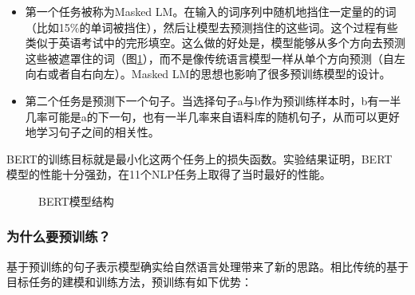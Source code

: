 \begin{itemize}
\vspace{0.5em}
\item 第一个任务被称为Masked LM。在输入的词序列中随机地挡住一定量的的词（比如15\%的单词被挡住），然后让模型去预测挡住的这些词。这个过程有些类似于英语考试中的完形填空。这么做的好处是，模型能够从多个方向去预测这些被遮罩住的词（图\ref{fig:5-72}），而不是像传统语言模型一样从单个方向预测（自左向右或者自右向左）。Masked LM的思想也影响了很多预训练模型的设计。
\vspace{0.5em}
\item 第二个任务是预测下一个句子。当选择句子a与b作为预训练样本时，b有一半几率可能是a的下一句，也有一半几率来自语料库的随机句子，从而可以更好地学习句子之间的相关性。
\vspace{0.5em}
\end{itemize}

\parinterval  BERT的训练目标就是最小化这两个任务上的损失函数。实验结果证明，BERT\\模型的性能十分强劲，在11个NLP任务上取得了当时最好的性能。

\begin{figure}[htp]
\centering

\caption{BERT模型结构}
\label{fig:5-72}
\end{figure}
\vspace{-0.5em}


\subsubsection{为什么要预训练？}

\parinterval  基于预训练的句子表示模型确实给自然语言处理带来了新的思路。相比传统的基于目标任务的建模和训练方法，预训练有如下优势：

